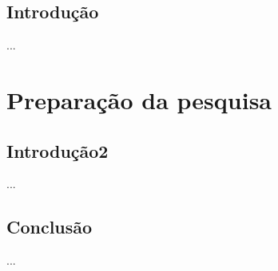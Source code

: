 \documentclass[
	12pt,
	a4paper,
	twoside, %
    english
	]{abntex2}
\begin{document}
\frenchspacing  %

\textual

\chapter{Introdução}

...

\part{Preparação da pesquisa}

\chapter{Introdução2}

...

\chapter{Conclusão}

...




\postextual




\begin{apendicesenv}

\partapendices %

\end{apendicesenv}


%
%


\end{document}
